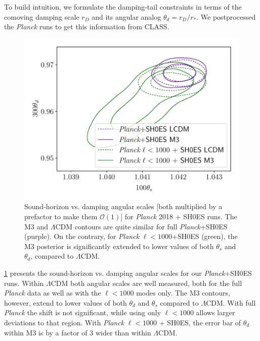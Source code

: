 To build intuition, we formulate the damping-tail constraints in terms of the comoving damping scale $r_D$ and its angular analog $\theta_d=r_D/r_*$.
We postprocessed the {\it Planck} runs to get this information from CLASS.

\begin{figure}[ht!]
\includegraphics[width=\columnwidth]{img/planck-theta_s-d.pdf}
\caption[Sound-horizon vs. damping angular scales for {\it Planck} 2018 + SH0ES]{Sound-horizon vs. damping angular scales [both multiplied by a prefactor to make them $\mathcal O(1)$] for {\it Planck} 2018 + SH0ES runs.
The M3 and $\Lambda$CDM contours are quite similar for full {\it Planck}+SH0ES (purple).
On the contrary, for {\it Planck} $\ell<1000$+SH0ES (green), the M3 posterior is significantly extended to lower values of both $\theta_s$ and $\theta_d$, compared to $\Lambda$CDM.}
\label{fig:planck-theta_s-d}
\end{figure}

\cref{fig:planck-theta_s-d} presents the sound-horizon vs. damping angular scales for our {\it Planck}+SH0ES runs. 
Within $\Lambda$CDM both angular scales are well measured, both for the full {\it Planck} data as well as with the $\ell<1000$ modes only.
The M3 contours, however, extend to lower values of both $\theta_d$ and $\theta_s$ compared to $\Lambda$CDM. 
With full {\it Planck} the shift is not significant, while using only $\ell<1000$ allows larger deviations to that region. 
With {\it Planck} $\ell<1000$ + SH0ES, the error bar of $\theta_d$ within M3 is by a factor of 3 wider than within $\Lambda$CDM.

